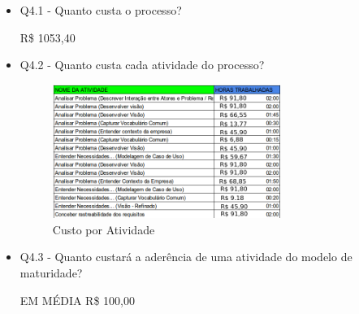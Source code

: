 \begin{itemize}
\item Q4.1 - Quanto custa o processo?

R\$ 1053,40

\item Q4.2 - Quanto custa cada atividade do processo?


\begin{figure}[H]
  \center
  \includegraphics[width=0.7\textwidth]{figuras/custo-atv2}
  \caption{Custo por Atividade}
  \label{fig:custo-atv2}
\end{figure}

\item Q4.3 - Quanto custará a aderência de uma atividade do modelo de maturidade?

EM MÉDIA R\$ 100,00

\end{itemize}
